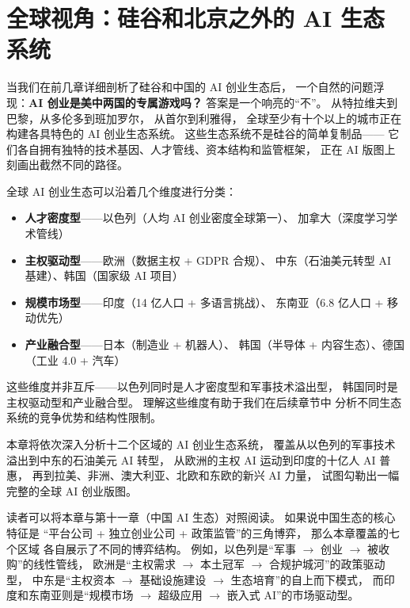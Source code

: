 \chapter{全球视角：硅谷和北京之外的 AI 生态系统}
\label{ch:global}


当我们在前几章详细剖析了硅谷和中国的 AI 创业生态后，
一个自然的问题浮现：\textbf{AI 创业是美中两国的专属游戏吗？}
答案是一个响亮的``不''。
从特拉维夫到巴黎，从多伦多到班加罗尔，
从首尔到利雅得，
全球至少有十个以上的城市正在构建各具特色的 AI 创业生态系统。
这些生态系统不是硅谷的简单复制品——
它们各自拥有独特的技术基因、人才管线、资本结构和监管框架，
正在 AI 版图上刻画出截然不同的路径。

\begin{corebox}
全球 AI 创业生态可以沿着几个维度进行分类：
\begin{itemize}[noitemsep]
  \item \textbf{人才密度型}——以色列（人均 AI 创业密度全球第一）、
        加拿大（深度学习学术管线）
  \item \textbf{主权驱动型}——欧洲（数据主权 + GDPR 合规）、
        中东（石油美元转型 AI 基建）、韩国（国家级 AI 项目）
  \item \textbf{规模市场型}——印度（14 亿人口 + 多语言挑战）、
        东南亚（6.8 亿人口 + 移动优先）
  \item \textbf{产业融合型}——日本（制造业 + 机器人）、
        韩国（半导体 + 内容生态）、德国（工业 4.0 + 汽车）
\end{itemize}
这些维度并非互斥——以色列同时是人才密度型和军事技术溢出型，
韩国同时是主权驱动型和产业融合型。
理解这些维度有助于我们在后续章节中
分析不同生态系统的竞争优势和结构性限制。
\end{corebox}

本章将依次深入分析十二个区域的 AI 创业生态系统，
覆盖从以色列的军事技术溢出到中东的石油美元 AI 转型，
从欧洲的主权 AI 运动到印度的十亿人 AI 普惠，
再到拉美、非洲、澳大利亚、北欧和东欧的新兴 AI 力量，
试图勾勒出一幅完整的全球 AI 创业版图。

读者可以将本章与第十一章（中国 AI 生态）对照阅读。
如果说中国生态的核心特征是
``平台公司 + 独立创业公司 + 政策监管''的三角博弈，
那么本章覆盖的七个区域
各自展示了不同的博弈结构。
例如，以色列是``军事 $\to$ 创业 $\to$ 被收购''的线性管线，
欧洲是``主权需求 $\to$ 本土冠军 $\to$ 合规护城河''的政策驱动型，
中东是``主权资本 $\to$ 基础设施建设 $\to$ 生态培育''的自上而下模式，
而印度和东南亚则是``规模市场 $\to$ 超级应用 $\to$ 嵌入式 AI''的市场驱动型。

